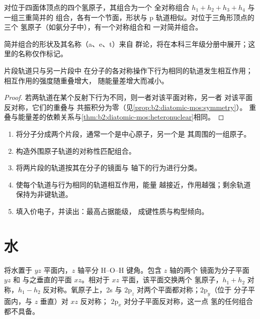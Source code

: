 \begin{proposition}[三个与四个氢原子]\label{prop:b2:fragment-orbitals:h4}
对位于四面体顶点的四个氢原子，其组合为一个
全对称组合 $h_1 + h_2 + h_3 + h_4$ 与一组三重简并的
组合，各有一个节面，形状与 p 轨道相似。对位于三角形顶点的三个
氢原子（如氨分子中），有一个对称组合和
一对简并组合。
\end{proposition}

\admitted

简并组合的形状及其名称（a、e、t）来自
群论，将在本科三年级分册中展开；这里的名称仅作标记。

\begin{proposition}[只有同类相互作用]\label{prop:b2:fragment-orbitals:interaction-rules}
片段轨道只与另一片段中
在分子的各对称操作下行为相同的轨道发生相互作用；
相互作用的强度随重叠增大，
随能量差增大而减小。
\end{proposition}

\begin{proof}
若两轨道在某个反射下行为不同，则一者对该平面对称，另一者
对该平面反对称，它们的重叠与
共振积分为零（见\cref{prop:b2:diatomic-mos:symmetry}）。
重叠与能量差的依赖关系与\cref{thm:b2:diatomic-mos:heteronuclear}相同。
\end{proof}

\begin{method}[片段图]\label{met:b2:fragment-orbitals:fragment-diagram}
\begin{enumerate}
  \item 将分子分成两个片段，通常一个是中心原子，另一个是
        其周围的一组原子。
  \item 构造外围原子轨道的对称性匹配组合。
  \item 将两片段的轨道按其在分子的镜面与
        轴下的行为进行分类。
  \item 使每个轨道与行为相同的轨道相互作用，能量
        越接近，作用越强；剩余轨道保持为非键轨道。
  \item 填入价电子，并读出：最高占据能级，
        成键性质与构型倾向。
\end{enumerate}
\end{method}

\section{水}

将水置于 $yz$ 平面内，$z$ 轴平分 H--O--H 键角。包含 $z$ 轴的两个
镜面为分子平面 $yz$ 和
与之垂直的平面 $xz$。相对于 $xz$ 平面，该平面交换两个
氢原子，$h_1 + h_2$ 对称，$h_1 - h_2$ 反对称。氧原子上，2s 与
$2\mathrm p_z$ 对两个平面都对称；$2\mathrm p_y$（位于
分子平面内，与 $z$ 垂直）对 $xz$ 反对称；
$2\mathrm p_x$ 对分子平面反对称，这一点
氢的任何组合都不具备。

